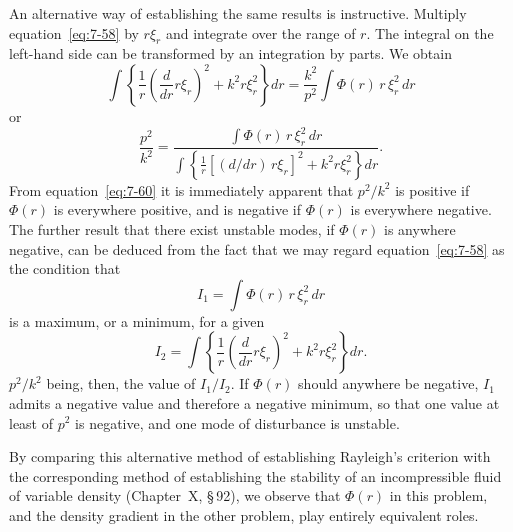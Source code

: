 An alternative way of establishing the same results is instructive.
Multiply equation~\eqref{eq:7-58} by $r\xi_r$ and integrate over the range of $r$.  The
integral on the left-hand side can be transformed by an integration by
parts.  We obtain
\begin{equation}
\label{eq:7-59}
\int\!\left\{
\frac{1}{r}\!\left(\frac{d}{dr}r\xi_r\right)^{\!2}
+ k^2 r\xi_r^2
\right\} dr
= \frac{k^2}{p^2}\int \Phi(r)\, r\,\xi_r^2\, dr
\end{equation}
or
\begin{equation}
\label{eq:7-60}
\frac{p^2}{k^2} = \frac{\displaystyle\int \Phi(r)\, r\, \xi_r^2\, dr}
{\displaystyle\int\!\left\{
\frac{1}{r}[\!(d/dr)\, r\xi_r\!]^2 + k^2 r\xi_r^2
\right\} dr}.
\end{equation}
From equation~\eqref{eq:7-60} it is immediately apparent that $p^2\!/k^2$ is positive if
$\Phi(r)$ is everywhere positive, and is negative if $\Phi(r)$ is everywhere negative.
The further result that there exist unstable modes, if $\Phi(r)$ is anywhere
negative, can be deduced from the fact that we may regard equation~\eqref{eq:7-58} as the condition that
\begin{equation}
\label{eq:7-61}
I_1 = \int \Phi(r)\, r\, \xi_r^2\, dr
\end{equation}
is a maximum, or a minimum, for a given
\begin{equation}
\label{eq:7-62}
I_2 = \int\!\left\{
\frac{1}{r}\!\left(\frac{d}{dr}r\xi_r\right)^{\!2}
+ k^2 r\xi_r^2
\right\} dr.
\end{equation}
$p^2\!/k^2$ being, then, the value of $I_1/I_2$.  If $\Phi(r)$ should anywhere be negative,
$I_1$ admits a negative value and therefore a negative minimum, so that
one value at least of $p^2$ is negative, and one mode of disturbance is
unstable.

By comparing this alternative method of establishing Rayleigh's
criterion with the corresponding method of establishing the stability of
an incompressible fluid of variable density (Chapter~X, \S\,92), we observe
that $\Phi(r)$ in this problem, and the density gradient in the other problem,
play entirely equivalent roles.

